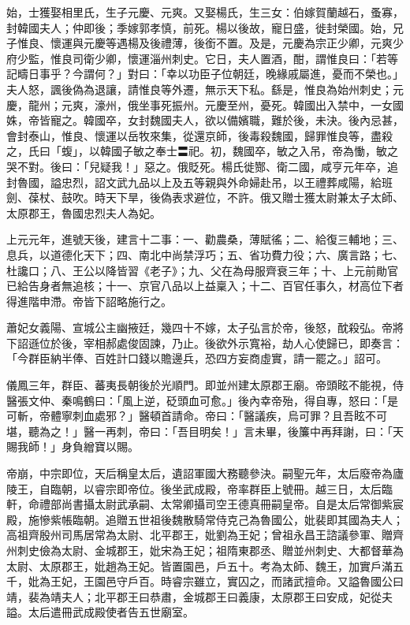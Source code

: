 \begin{pinyinscope}
 始，士獲娶相里氏，生子元慶、元爽。又娶楊氏，生三女：伯嫁賀蘭越石，蚤寡，封韓國夫人；仲即後；季嫁郭孝慎，前死。楊以後故，寵日盛，徙封榮國。始，兄子惟良、懷運與元慶等遇楊及後禮薄，後銜不置。及是，元慶為宗正少卿，元爽少府少監，惟良司衛少卿，懷運淄州刺史。它日，夫人置酒，酣，謂惟良曰：「若等記疇日事乎？今謂何？」對曰：「幸以功臣子位朝廷，晚緣戚屬進，憂而不榮也。」夫人怒，諷後偽為退讓，請惟良等外遷，無示天下私。繇是，惟良為始州刺史；元慶，龍州；元爽，濠州，俄坐事死振州。元慶至州，憂死。韓國出入禁中，一女國姝，帝皆寵之。韓國卒，女封魏國夫人，欲以備嬪職，難於後，未決。後內忌甚，會封泰山，惟良、懷運以岳牧來集，從還京師，後毒殺魏國，歸罪惟良等，盡殺之，氏曰「蝮」，以韓國子敏之奉士〓祀。初，魏國卒，敏之入吊，帝為慟，敏之哭不對。後曰：「兒疑我！」惡之。俄貶死。楊氏徙酂、衛二國，咸亨元年卒，追封魯國，謚忠烈，詔文武九品以上及五等親與外命婦赴吊，以王禮葬咸陽，給班劍、葆杖、鼓吹。時天下旱，後偽表求避位，不許。俄又贈士獲太尉兼太子太師、太原郡王，魯國忠烈夫人為妃。



 上元元年，進號天後，建言十二事：一、勸農桑，薄賦徭；二、給復三輔地；三、息兵，以道德化天下；四、南北中尚禁浮巧；五、省功費力役；六、廣言路；七、杜讒口；八、王公以降皆習《老子》；九、父在為母服齊衰三年；十、上元前勛官已給告身者無追核；十一、京官八品以上益稟入；十二、百官任事久，材高位下者得進階申滯。帝皆下詔略施行之。



 蕭妃女義陽、宣城公主幽掖廷，幾四十不嫁，太子弘言於帝，後怒，酖殺弘。帝將下詔遜位於後，宰相郝處俊固諫，乃止。後欲外示寬裕，劫人心使歸已，即奏言：「今群臣納半俸、百姓計口錢以贍邊兵，恐四方妄商虛實，請一罷之。」詔可。



 儀鳳三年，群臣、蕃夷長朝後於光順門。即並州建太原郡王廟。帝頭眩不能視，侍醫張文仲、秦鳴鶴曰：「風上逆，砭頭血可愈。」後內幸帝殆，得自專，怒曰：「是可斬，帝體寧刺血處邪？」醫頓首請命。帝曰：「醫議疾，烏可罪？且吾眩不可堪，聽為之！」醫一再刺，帝曰：「吾目明矣！」言未畢，後簾中再拜謝，曰：「天賜我師！」身負繒寶以賜。



 帝崩，中宗即位，天后稱皇太后，遺詔軍國大務聽參決。嗣聖元年，太后廢帝為廬陵王，自臨朝，以睿宗即帝位。後坐武成殿，帝率群臣上號冊。越三日，太后臨軒，命禮部尚書攝太尉武承嗣、太常卿攝司空王德真冊嗣皇帝。自是太后常御紫宸殿，施慘紫帳臨朝。追贈五世祖後魏散騎常侍克己為魯國公，妣裴即其國為夫人；高祖齊殷州司馬居常為太尉、北平郡王，妣劉為王妃；曾祖永昌王諮議參軍、贈齊州刺史儉為太尉、金城郡王，妣宋為王妃；祖隋東郡丞、贈並州刺史、大都督華為太尉、太原郡王，妣趙為王妃。皆置園邑，戶五十。考為太師、魏王，加實戶滿五千，妣為王妃，王園邑守戶百。時睿宗雖立，實囚之，而諸武擅命。又謚魯國公曰靖，裴為靖夫人；北平郡王曰恭肅，金城郡王曰義康，太原郡王曰安成，妃從夫謚。太后遣冊武成殿使者告五世廟室。




\end{pinyinscope}
